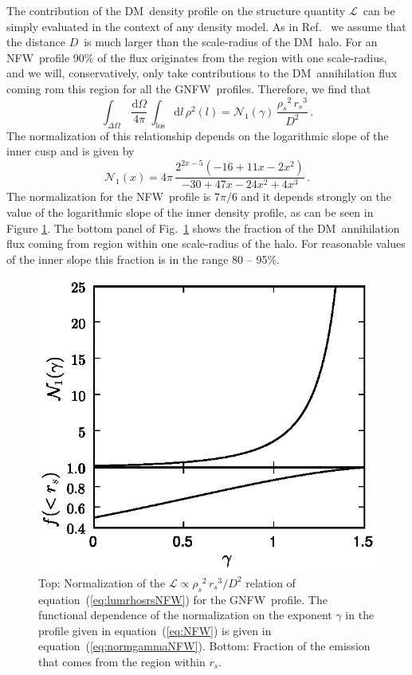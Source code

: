 \documentclass[aps,prd,twocolumn,amsmath,amssymb,floatfix,nofootinbib,10pt]{revtex4}
\newcommand{\NFW}{NFW}
\newcommand{\GNFW}{G\NFW}
\newcommand{\DM}{DM}
\newcommand{\dd}{\mathrm{d}}
\newcommand{\eqnname}{equation}
\newcommand{\los}{los}
\newcommand{\lum}{\ensuremath{\mathcal{L}}}
\newcommand{\rhos}{\ensuremath{\rho_s}}
\newcommand{\rs}{\ensuremath{r_s}}
\newcommand{\dist}{\ensuremath{D}}
\newcommand{\norm}{\ensuremath{\mathcal{N}}}
\newcommand{\normnfw}{\ensuremath{\norm_1}}
\begin{document}
The contribution of the \DM\ density profile on the structure quantity
\lum\ can be simply evaluated in the context of any density model. As
in Ref.~\cite{2007PhRvD..75h3526S} we assume that the distance
\dist\ is much larger than the scale-radius of the \DM\ halo. For an
\NFW\ profile 90\% of the flux originates from the region with one
scale-radius, and we will, conservatively, only take contributions to
the \DM\ annihilation flux coming rom this region for all the
\GNFW\ profiles. Therefore, we find that 
\begin{equation}\label{eq:lumrhosrsNFW}
\int_{\Delta\Omega}\,\frac{\dd\Omega}{4\pi}\,\int_{\mathrm{\los}} \dd
l\, \rho^2(l)= \normnfw(\gamma)\, \frac{\rhos^2\, \rs^3}{\dist^2}\, .
\end{equation}
The normalization of this relationship depends on the logarithmic
slope of the inner cusp and is given by
\begin{equation}\label{eq:normgammaNFW}
\normnfw(x) = 4 \pi  \, \frac{2^{2x-5}\left(-16+11x-2x^2\right)}{-30+47x-24x^2+4x^3}\, .
\end{equation}
The normalization for the \NFW\ profile is $7\pi/6$ and it depends
strongly on the value of the logarithmic slope of the inner density
profile, as can be seen in Figure \ref{fig:normgammaNFW}. The bottom
panel of Fig.~\ref{fig:normgammaNFW} shows the fraction of the \DM\
annihilation flux coming from region within one scale-radius of the
halo. For reasonable values of the inner slope this fraction is in the
range 80 -- 95\%.

\begin{figure}[t]
\centering
\includegraphics{normgammaNFW.eps}
\caption{Top: Normalization of the $\lum \propto \rhos^2\,
\rs^3/\dist^2$ relation of \eqnname\ (\ref{eq:lumrhosrsNFW}) for the
\GNFW\ profile. The functional dependence of the normalization on the
exponent $\gamma$ in the profile given in \eqnname\ (\ref{eq:NFW}) is
given in \eqnname\ (\ref{eq:normgammaNFW}). Bottom: Fraction of the
emission that comes from the region within \rs.}%
\label{fig:normgammaNFW}%
\end{figure}
\end{document}
